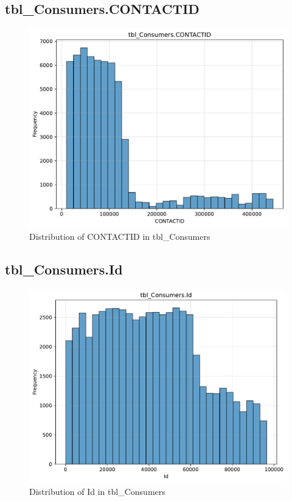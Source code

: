 \subsection{tbl\_Consumers.CONTACTID}

\begin{figure}[htbp]
\centering
\includegraphics[width=\textwidth]{figures/dbo_tbl_Consumers_CONTACTID.pdf}
\caption{Distribution of CONTACTID in tbl\_Consumers}
\end{figure}\newpage

\subsection{tbl\_Consumers.Id}

\begin{figure}[htbp]
\centering
\includegraphics[width=\textwidth]{figures/dbo_tbl_Consumers_Id.pdf}
\caption{Distribution of Id in tbl\_Consumers}
\end{figure}\newpage

